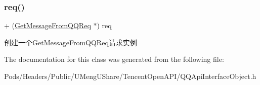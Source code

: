 \subsubsection{\texorpdfstring{req()}{req()}\hspace{0.1cm}{\footnotesize\ttfamily [2/2]}}
{\footnotesize\ttfamily + (\mbox{\hyperlink{interface_get_message_from_q_q_req}{Get\+Message\+From\+Q\+Q\+Req}} $\ast$) req \begin{DoxyParamCaption}{ }\end{DoxyParamCaption}}

创建一个\+Get\+Message\+From\+Q\+Q\+Req请求实例 

The documentation for this class was generated from the following file\+:\begin{DoxyCompactItemize}
\item 
Pods/\+Headers/\+Public/\+U\+Meng\+U\+Share/\+Tencent\+Open\+A\+P\+I/Q\+Q\+Api\+Interface\+Object.\+h\end{DoxyCompactItemize}

